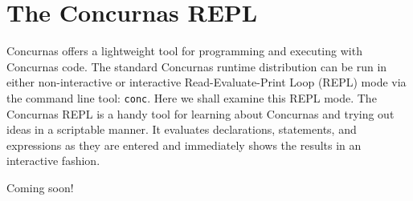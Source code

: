 \documentclass[conc-doc]{subfiles}
\begin{document}
	\chapter[The Concurnas REPL]{The Concurnas REPL}
	\label{ch:repl}
	
	Concurnas offers a lightweight tool for programming and executing with Concurnas code. The standard Concurnas runtime distribution can be run in either non-interactive or interactive Read-Evaluate-Print Loop (REPL) mode via the command line tool: \lstinline{conc}. Here we shall examine this REPL mode. The Concurnas REPL is a handy tool for learning about Concurnas and trying out ideas in a scriptable manner. It evaluates declarations, statements, and expressions as they are entered and immediately shows the results in an interactive fashion.	
	
	Coming soon!
\end{document}

